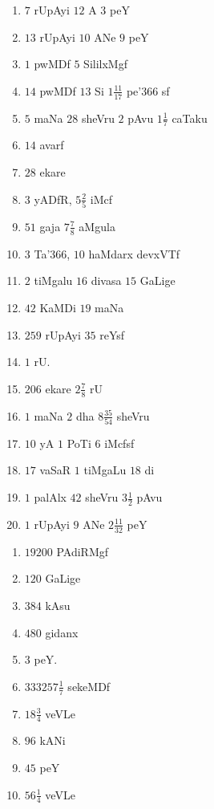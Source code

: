 \begin{multicols}{2}
\begin{enumerate}[$(1)$]
\item $7$ rUpAyi $12$ A $3$ peY 
\item $13$ rUpAyi $10$ ANe $9$ peY
\item $1$ pwMDf $5$ SililxMgf 
\item $14$ pwMDf $13$ Si $1 \frac{11}{17}$ pe\char'366 sf
\item $5$ maNa $28$ sheVru $2$ pAvu $1 \frac{1}{7}$ caTaku
\item $14$ avarf
\item $28$ ekare 
\item $3$ yADfR, $5 \frac{2}{5}$ iMcf
\item $51$ gaja $7 \frac{7}{8}$ aMgula 
\item $3$ Ta\char'366, $10$ haMdarx devxVTf
\item $2$ tiMgalu $16$ divasa $15$ GaLige
\item $42$ KaMDi $19$ maNa
\item $259$ rUpAyi $35$ reYsf
\item $1$ rU. 
\item $206$ ekare $2 \frac{7}{8}$ rU
\item $1$ maNa $2$ dha $8 \frac{35}{54}$ sheVru 
\item $10$ yA $1$ PoTi $6$ iMcfsf
\item $17$ vaSaR $1$ tiMgaLu $18$ di
\item $1$ palAlx $42$ sheVru $3 \frac{1}{2}$ pAvu
\item $1$ rUpAyi $9$ ANe $2\frac{11}{32}$ peY
\end{enumerate}
\end{multicols}


\begin{multicols}{3}
\begin{enumerate}[$(1)$]
\item $19200$ PAdiRMgf 
\item $120$ GaLige
\item $384$ kAsu 
\item $480$ gidanx
\item $3$ peY. 
\item $333257 \frac{1}{7}$ sekeMDf
\item $18 \frac{3}{4}$ veVLe
\item $96$ kANi
\item $45$ peY 
\item $56 \frac{1}{4}$ veVLe
\end{enumerate}
\end{multicols}

